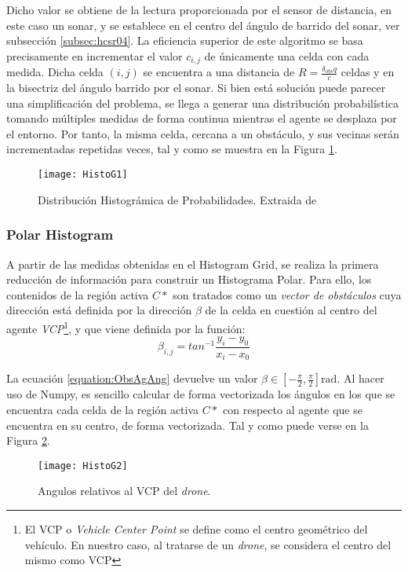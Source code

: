 Dicho valor se obtiene de la lectura proporcionada por el sensor de distancia, en este caso un sonar, y se establece en el centro del ángulo de barrido del sonar, ver subsección \ref{subsec:hcsr04}. 
La eficiencia superior de este algoritmo se basa precisamente en incrementar el valor $c_{i,j}$ de únicamente una celda con cada medida. Dicha celda $(i,j)$ se encuentra a una distancia de $R = \frac{\delta_{obs}q}{c}$ celdas y en la bisectriz del ángulo barrido por el sonar.
Si bien está solución puede parecer una simplificación del problema, se llega a generar una distribución probabilística tomando múltiples medidas de forma continua mientras el agente se desplaza por el entorno. Por tanto, la misma celda, cercana a un obstáculo, y sus vecinas serán incrementadas repetidas veces, tal y como se muestra en la Figura \ref{fig:histog1}.
 \begin{figure}
	\centering
	\texttt{[image: HistoG1]}
	\caption[Distribución Histográmica de Probabilidades.]{Distribución Histográmica de Probabilidades. Extraida de \citep{art:BorensteinKorenVFH}}\label{fig:histog1}
\end{figure}

\subsubsection{Polar Histogram}
\label{subsubsec:PH}
A partir de las medidas obtenidas en el Histogram Grid, se realiza la primera reducción de información para construir un Histograma Polar. Para ello, los contenidos de la región activa $C*$ son tratados como un \textit{vector de obstáculos} cuya dirección está definida por la dirección $\beta$ de la celda en cuestión al centro del agente \textit{VCP}\footnote{El VCP o \textit{Vehicle Center Point} se define como el centro geométrico del vehículo. En nuestro caso, al tratarse de un \emph{drone}, se considera el centro del mismo como VCP}, y que viene definida por la función:
\begin{equation}
\label{equation:ObsAgAng}
\beta_{i,j}= tan^{-1} \frac{y_i - y_0}{x_i - x_0}
\end{equation}

La ecuación \ref{equation:ObsAgAng} devuelve un valor $\beta \in [-\frac{\pi}{2}, \frac{\pi}{2}]\text{rad}$. Al hacer uso de Numpy, es sencillo calcular de forma vectorizada los ángulos en los que se encuentra cada celda de la región activa $C*$ con respecto al agente que se encuentra en su centro, de forma vectorizada. Tal y como puede verse en la Figura \ref{fig:histog2}.
 \begin{figure}
	\centering
	\texttt{[image: HistoG2]}
	\caption{Angulos relativos al VCP del \emph{drone}.}\label{fig:histog2}
\end{figure}

